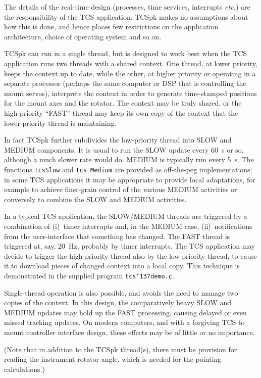 \documentclass[12pt,fleqn,twoside]{article}
\renewcommand{\_}{{\tt\char'137}}     %
\begin{document}
The details of the real-time design (processes, time services,
interrupts {\it etc.}) are the responsibility of the TCS application.
TCSpk makes no assumptions about how this is done, and hence
places few restrictions on the application architecture, choice
of operating system and so on.

TCSpk can run in a single thread, but
is designed to work best when the TCS application
runs two threads with a shared context.  One thread, at lower
priority, keeps the context up to date, while the other,
at higher priority or operating in
a separate processor (perhaps the
same computer or DSP that is controlling the
mount servos), interprets the
context in order to generate time-stamped positions
for the mount axes and the rotator.  The context may be truly shared,
or the high-priority ``FAST'' thread may keep its own copy of the context
that the lower-priority thread is maintaining.

In fact TCSpk further subdivides the low-priority thread
into SLOW and MEDIUM components.  It is usual to run
the SLOW update every 60~s or so, although a much slower rate
would do.  MEDIUM is typically run every 5~s.  The functions
{\tt tcsSlow} and {\tt tcs Medium} are provided as off-the-peg
implementations;  in some TCS applications
it may be appropriate to provide local adaptations, for example
to achieve finer-grain control of the various MEDIUM activities
or conversely to combine the SLOW and MEDIUM activities.

In a typical TCS application, the SLOW/MEDIUM threads are
triggered by a combination of (i)~timer interrupts and, in the
MEDIUM case,
(ii)~notifications from the user-interface that
something has changed.  The FAST thread is triggered at,
say, 20~Hz, probably by timer interrupts.  The TCS application may
decide to trigger the high-priority thread also by the low-priority
thread, to cause it to download pieces of changed context into
a local copy.  This
technique is demonstrated in the supplied program {\tt tcs\_demo.c}.

Single-thread operation is also possible, and avoids the need to
manage two copies of the context.  In this design, the comparatively
heavy SLOW and MEDIUM updates may hold up the FAST processing, causing
delayed or even missed tracking updates.  On modern computers, and
with a forgiving TCS to mount controller interface
design, these effects may be of little or no importance.

(Note that in addition to the TCSpk thread(s), there must be provision
for reading the instrument rotator angle, which is needed
for the pointing calculations.)
\end{document}
